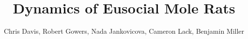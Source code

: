 \documentclass[xcolor={dvipsnames,svgnames}]{beamer}
\author{Chris Davis, Robert Gowers, Nada Jankovicova, Cameron Lack, Benjamin Miller}
\title{Dynamics of Eusocial Mole Rats}
\begin{document}
	\begin{frame}
		\titlepage
	\end{frame}
	
\end{document}
